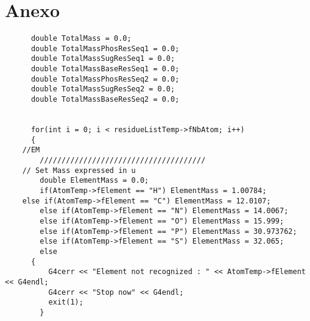\clearpage
\section{Anexo}
\label{app:A}
\lstset {language=C++}
\begin{lstlisting}
      double TotalMass = 0.0;
      double TotalMassPhosResSeq1 = 0.0;
      double TotalMassSugResSeq1 = 0.0;
      double TotalMassBaseResSeq1 = 0.0;
      double TotalMassPhosResSeq2 = 0.0;
      double TotalMassSugResSeq2 = 0.0;
      double TotalMassBaseResSeq2 = 0.0;


      for(int i = 0; i < residueListTemp->fNbAtom; i++)
      {
	//EM
      	//////////////////////////////////////
	// Set Mass expressed in u
        double ElementMass = 0.0;
        if(AtomTemp->fElement == "H") ElementMass = 1.00784;
	else if(AtomTemp->fElement == "C") ElementMass = 12.0107;
        else if(AtomTemp->fElement == "N") ElementMass = 14.0067;
        else if(AtomTemp->fElement == "O") ElementMass = 15.999;
        else if(AtomTemp->fElement == "P") ElementMass = 30.973762;
        else if(AtomTemp->fElement == "S") ElementMass = 32.065;
        else
	  {
          G4cerr << "Element not recognized : " << AtomTemp->fElement << G4endl;
          G4cerr << "Stop now" << G4endl;
          exit(1);
        }
\end{lstlisting}
